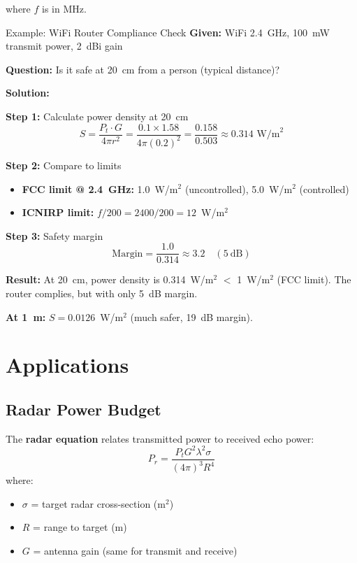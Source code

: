 where $f$ is in MHz.

\begin{calloutbox}{Example: WiFi Router Compliance Check}
\textbf{Given:} WiFi 2.4~GHz, 100~mW transmit power, 2~dBi gain

\textbf{Question:} Is it safe at 20~cm from a person (typical distance)?

\textbf{Solution:}

\textbf{Step 1:} Calculate power density at 20~cm
\[
S = \frac{P_t \cdot G}{4\pi r^2} = \frac{0.1 \times 1.58}{4\pi (0.2)^2} = \frac{0.158}{0.503} \approx 0.314 \text{~W/m}^2
\]

\textbf{Step 2:} Compare to limits
\begin{itemize}
\item \textbf{FCC limit @ 2.4~GHz:} 1.0~W/m$^2$ (uncontrolled), 5.0~W/m$^2$ (controlled)
\item \textbf{ICNIRP limit:} $f/200 = 2400/200 = 12$~W/m$^2$
\end{itemize}

\textbf{Step 3:} Safety margin
\[
\text{Margin} = \frac{1.0}{0.314} \approx 3.2 \quad (5~\text{dB})
\]

\textbf{Result:} At 20~cm, power density is 0.314~W/m$^2$ $<$ 1~W/m$^2$ (FCC limit). The router complies, but with only 5~dB margin.

\textbf{At 1~m:} $S = 0.0126$~W/m$^2$ (much safer, 19~dB margin).
\end{calloutbox}

\section{Applications}

\subsection{Radar Power Budget}

The \textbf{radar equation} relates transmitted power to received echo power:
\begin{equation}
P_r = \frac{P_t G^2 \lambda^2 \sigma}{(4\pi)^3 R^4}
\label{eq:radar-equation}
\end{equation}
where:
\begin{itemize}
\item $\sigma$ = target radar cross-section (m$^2$)
\item $R$ = range to target (m)
\item $G$ = antenna gain (same for transmit and receive)
\end{itemize}

